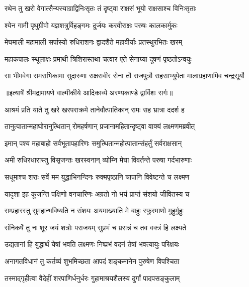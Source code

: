 \twolineshloka
{रथेन तु खरो वेगात्सैन्यस्याग्राद्विनिःसृतः}
{तं दृष्ट्वा राक्षसं भूयो राक्षसाश्च विनिःसृताः} %

\twolineshloka
{श्येन गामी पृथुग्रीवो यज्ञशत्रुर्विहङ्गमः}
{दुर्जयः करवीराक्षः परुषः कालकार्मुकः} %

\twolineshloka
{मेघमाली महामाली सर्पास्यो रुधिराशनः}
{द्वादशैते महावीर्याः प्रतस्थुरभितः खरम्} %

\twolineshloka
{महाकपालः स्थूलाक्षः प्रमाथी त्रिशिरास्तथा}
{चत्वार एते सेनाग्र्या दूषणं पृष्ठतोऽन्वयुः} %

\fourlineindentedshloka
{सा भीमवेगा समराभिकामा}
{सुदारुणा राक्षसवीर सेना}
{तौ राजपुत्रौ सहसाभ्युपेता}
{मालाग्रहाणामिव चन्द्रसूर्यौ} %


{॥इत्यार्षे श्रीमद्रामायणे वाल्मीकीये आदिकाव्ये अरण्यकाण्डे द्वाविंशः सर्गः॥}


\twolineshloka
{आश्रमं प्रति याते तु खरे खरपराक्रमे}
{तानेवौत्पातिकान् रामः सह भ्रात्रा ददर्श ह} %

\twolineshloka
{तानुत्पातान्महाघोरानुत्थितान् रोमहर्षणान्}
{प्रजानामहितान्दृष्ट्वा वाक्यं लक्ष्मणमब्रवीत्} %

\twolineshloka
{इमान् पश्य महाबाहो सर्वभूतापहारिणः}
{समुत्थितान्महोत्पातान्संहर्तुं सर्वराक्षसान्} %

\twolineshloka
{अमी रुधिरधारास्तु विसृजन्तः खरस्वनान्}
{व्योम्नि मेघा विवर्तन्ते परुषा गर्दभारुणाः} %

\twolineshloka
{सधूमाश्च शराः सर्वे मम युद्धाभिनन्दिनः}
{रुक्मपृष्ठानि चापानि विवेष्टन्ते च लक्ष्मण} %

\twolineshloka
{यादृशा इह कूजन्ति पक्षिणो वनचारिणः}
{अग्रतो नो भयं प्राप्तं संशयो जीवितस्य च} %

\twolineshloka
{सम्प्रहारस्तु सुमहान्भविष्यति न संशयः}
{अयमाख्याति मे बाहुः स्फुरमाणो मुहुर्मुहुः} %

\twolineshloka
{संनिकर्षे तु नः शूर जयं शत्रोः पराजयम्}
{सुप्रभं च प्रसन्नं च तव वक्त्रं हि लक्ष्यते} %

\twolineshloka
{उद्यतानां हि युद्धार्थं येषां भवति लक्ष्मणः}
{निष्प्रभं वदनं तेषां भवत्यायुः परिक्षयः} %

\twolineshloka
{अनागतविधानं तु कर्तव्यं शुभमिच्छता}
{आपदं शङ्कमानेन पुरुषेण विपश्चिता} %

\twolineshloka
{तस्माद्गृहीत्वा वैदेहीं शरपाणिर्धनुर्धरः}
{गुहामाश्रयशैलस्य दुर्गां पादपसङ्कुलाम्} %


